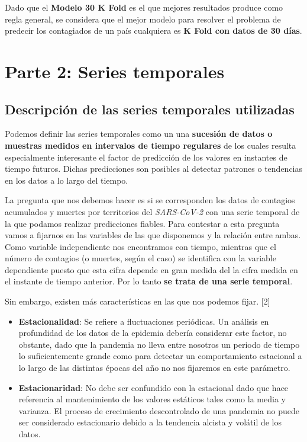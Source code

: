 \documentclass[12pt,a4paper, xcolor=table]{article}
\begin{document}
    \vspace{2mm}

    Dado que el \textbf{Modelo 30 K Fold} es el que mejores resultados produce como regla general, se considera que el mejor modelo para resolver el problema de predecir los contagiados de un país cualquiera es \textbf{K Fold con datos de 30 días}.





    \newpage
    \section{Parte 2: Series temporales}

    \subsection{Descripción de las series temporales utilizadas}

        Podemos definir las series temporales como un una \textbf{sucesión de datos o muestras medidos en intervalos de tiempo regulares} de los cuales resulta especialmente interesante el factor de predicción de los valores en instantes de tiempo futuros. Dichas predicciones son posibles al detectar patrones o tendencias en los datos a lo largo del tiempo.

        \vspace{2mm}

        La pregunta que nos debemos hacer es si se corresponden los datos de contagios acumulados y muertes por territorios del  \textit{SARS-CoV-2} con una serie temporal de la que podamos realizar predicciones fiables. Para contestar a esta pregunta vamos a fijarnos en las variables de las que disponemos y la relación entre ambas. Como variable independiente nos encontramos con tiempo, mientras que el número de contagios (o muertes, según el caso) se identifica con la variable dependiente puesto que esta cifra depende en gran medida del la cifra medida en el instante de tiempo anterior. Por lo tanto \textbf{se trata de una serie temporal}.

        \vspace{2mm}

        Sin embargo, existen más características en las que nos podemos fijar. [2]
    \begin{itemize}
    \item \textbf{Estacionalidad}: Se refiere a fluctuaciones periódicas. Un análisis en profundidad de los datos de la epidemia debería considerar este factor, no obstante, dado que la pandemia no lleva entre nosotros un periodo de tiempo lo suficientemente grande como para detectar un comportamiento estacional a lo largo de las distintas épocas del año no nos fijaremos en este parámetro.
    \item \textbf{Estacionaridad}: No debe ser confundido con la estacional dado que hace referencia al mantenimiento de los valores estáticos tales como la media y varianza. El proceso de crecimiento descontrolado de una pandemia no puede ser considerado estacionario debido a la tendencia alcista y volátil de los datos.
    \end{itemize}
\end{document}
